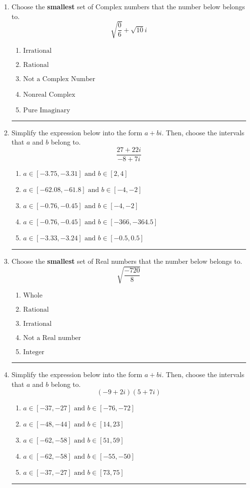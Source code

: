 \documentclass[14pt]{extbook}
\newcommand{\litem}[1]{\item#1\hspace*{-1cm}\rule{\textwidth}{0.4pt}}
\begin{document}
\begin{enumerate}
{\begin{enumerate}[label=\Alph*.]
\end{enumerate} }
\litem{
Choose the \textbf{smallest} set of Complex numbers that the number below belongs to.\[ \sqrt{\frac{0}{6}}+\sqrt{10}i \]\begin{enumerate}[label=\Alph*.]
\item \( \text{Irrational} \)
\item \( \text{Rational} \)
\item \( \text{Not a Complex Number} \)
\item \( \text{Nonreal Complex} \)
\item \( \text{Pure Imaginary} \)

\end{enumerate} }
\litem{
Simplify the expression below into the form $a+bi$. Then, choose the intervals that $a$ and $b$ belong to.\[ \frac{27 + 22 i}{-8 + 7 i} \]\begin{enumerate}[label=\Alph*.]
\item \( a \in [-3.75, -3.31] \text{ and } b \in [2, 4] \)
\item \( a \in [-62.08, -61.8] \text{ and } b \in [-4, -2] \)
\item \( a \in [-0.76, -0.45] \text{ and } b \in [-4, -2] \)
\item \( a \in [-0.76, -0.45] \text{ and } b \in [-366, -364.5] \)
\item \( a \in [-3.33, -3.24] \text{ and } b \in [-0.5, 0.5] \)

\end{enumerate} }
\litem{
Choose the \textbf{smallest} set of Real numbers that the number below belongs to.\[ \sqrt{\frac{-720}{8}} \]\begin{enumerate}[label=\Alph*.]
\item \( \text{Whole} \)
\item \( \text{Rational} \)
\item \( \text{Irrational} \)
\item \( \text{Not a Real number} \)
\item \( \text{Integer} \)

\end{enumerate} }
\litem{
Simplify the expression below into the form $a+bi$. Then, choose the intervals that $a$ and $b$ belong to.\[ (-9 + 2 i)(5 + 7 i) \]\begin{enumerate}[label=\Alph*.]
\item \( a \in [-37, -27] \text{ and } b \in [-76, -72] \)
\item \( a \in [-48, -44] \text{ and } b \in [14, 23] \)
\item \( a \in [-62, -58] \text{ and } b \in [51, 59] \)
\item \( a \in [-62, -58] \text{ and } b \in [-55, -50] \)
\item \( a \in [-37, -27] \text{ and } b \in [73, 75] \)


\end{enumerate}}
\end{enumerate}
\end{document}
